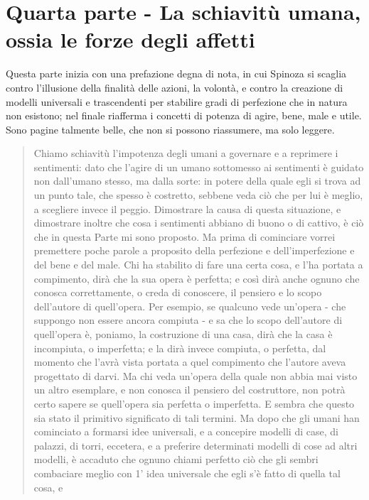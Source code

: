 \section[La schiavitù umana]{Quarta parte - La schiavitù umana, \\ossia le forze degli affetti}

Questa parte inizia con una prefazione degna di nota, in cui Spinoza si scaglia contro l'illusione della finalità delle azioni, la volontà, e contro la creazione di modelli universali e trascendenti per stabilire gradi di perfezione che in natura non esistono; nel finale riafferma i concetti di potenza di agire, bene, male e utile. Sono pagine talmente belle, che non si possono riassumere, ma solo leggere.

\begin{quotation}
	\small Chiamo schiavitù l’impotenza degli umani a governare e a reprimere i sentimenti: dato che l’agire di un umano sottomesso ai sentimenti è guidato non dall’umano
	stesso, ma dalla sorte: in potere della quale egli si trova ad un punto tale, che spesso è costretto, sebbene veda ciò che per lui è meglio, a scegliere invece il peggio. Dimostrare la
	causa di questa situazione, e dimostrare inoltre che cosa i sentimenti abbiano di buono o di
	cattivo, è ciò che in questa Parte mi sono proposto. Ma prima di cominciare vorrei premettere poche parole a proposito della perfezione e dell’imperfezione e del bene e del male.
	Chi ha stabilito di fare una certa cosa, e l’ha portata a compimento, dirà che la sua opera
	è perfetta; e così dirà anche ognuno che conosca correttamente, o creda di conoscere, il
	pensiero e lo scopo dell’autore di quell’opera. Per esempio, se qualcuno vede un’opera - che
	suppongo non essere ancora compiuta - e sa che lo scopo dell’autore di quell’opera è, poniamo, la costruzione di una casa, dirà che la casa è incompiuta, o imperfetta; e la dirà invece compiuta, o perfetta, dal momento che l’avrà vista portata a quel compimento che
	l’autore aveva progettato di darvi. Ma chi veda un’opera della quale non abbia mai visto un
	altro esemplare, e non conosca il pensiero del costruttore, non potrà certo sapere se
	quell’opera sia perfetta o imperfetta. E sembra che questo sia stato il primitivo significato
	di tali termini. Ma dopo che gli umani han cominciato a formarsi idee universali, e a concepire modelli di case, di palazzi, di torri, eccetera, e a preferire determinati modelli di cose ad altri modelli, è accaduto che ognuno chiami perfetto ciò
	che gli sembri combaciare meglio con 1’ idea universale che egli s’è fatto di quella tal cosa, e

\end{quotation}

